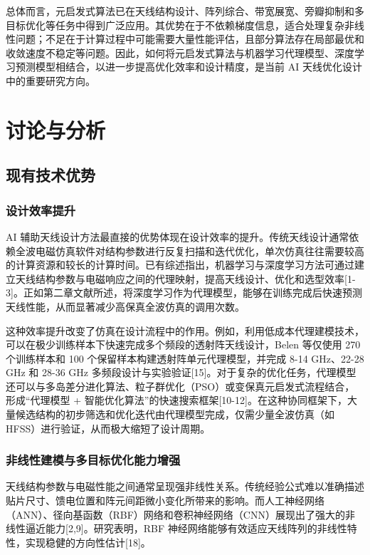 \documentclass[UTF8,a4paper,12pt]{ctexart}
\begin{document}
总体而言，元启发式算法已在天线结构设计、阵列综合、带宽展宽、旁瓣抑制和多目标优化等任务中得到广泛应用。其优势在于不依赖梯度信息，适合处理复杂非线性问题；不足在于计算过程中可能需要大量性能评估，且部分算法存在局部最优和收敛速度不稳定等问题。因此，如何将元启发式算法与机器学习代理模型、深度学习预测模型相结合，以进一步提高优化效率和设计精度，是当前 AI 天线优化设计中的重要研究方向。

\section{讨论与分析}

\subsection{现有技术优势}

\subsubsection{设计效率提升}

AI 辅助天线设计方法最直接的优势体现在设计效率的提升。传统天线设计通常依赖全波电磁仿真软件对结构参数进行反复扫描和迭代优化，单次仿真往往需要较高的计算资源和较长的计算时间。已有综述指出，机器学习与深度学习方法可通过建立天线结构参数与电磁响应之间的代理映射，提高天线设计、优化和选型效率[1-3]。正如第二章文献所述，将深度学习作为代理模型，能够在训练完成后快速预测天线性能，从而显著减少高保真全波仿真的调用次数。

这种效率提升改变了仿真在设计流程中的作用。例如，利用低成本代理建模技术，可以在极少训练样本下快速完成多个频段的透射阵天线设计，Belen 等仅使用 270 个训练样本和 100 个保留样本构建透射阵单元代理模型，并完成 8-14 GHz、22-28 GHz 和 28-36 GHz 多频段设计与实验验证[15]。对于复杂的优化任务，代理模型还可以与多岛差分进化算法、粒子群优化（PSO）或变保真元启发式流程结合，形成“代理模型 + 智能优化算法”的快速搜索框架[10-12]。在这种协同框架下，大量候选结构的初步筛选和优化迭代由代理模型完成，仅需少量全波仿真（如 HFSS）进行验证，从而极大缩短了设计周期。

\subsubsection{非线性建模与多目标优化能力增强}

天线结构参数与电磁性能之间通常呈现强非线性关系。传统经验公式难以准确描述贴片尺寸、馈电位置和阵元间距微小变化所带来的影响。而人工神经网络（ANN）、径向基函数（RBF）网络和卷积神经网络（CNN）展现出了强大的非线性逼近能力[2,9]。研究表明，RBF 神经网络能够有效适应天线阵列的非线性特性，实现稳健的方向性估计[18]。
\end{document}
